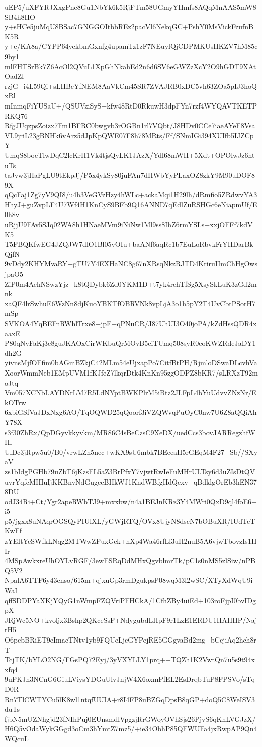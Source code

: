 uEP5/uXFYRJXxgPne8Gu1NbYk6k5RjFTm58UGmyYHmfs8AQqMnAAS5mW8SB4h8HO
y+sHCe5juMqU8BSac7GNGGOItbbREz2pacVl6NekqGC+PshY0MsVickFzufnBK5R
y+e/KA8a/CYPP64yekbmGxnfg4upamTz1zF7NEuylQjCDPMKUsHKZV7hM85c9by1
mlFHTSrBk7Z6AcOl2QVuL1XpGhNkahEd2n6d6SV6eGWZzXcY2O9hGDT9XAtOadZl
rzjG+i4L59Qi+sLHBcYfNEM8AaVkCm45SR7ZVAJRB0xDC5vh63ZOa5pIJ3hoQxRl
mInmqFiYUSaU+/QSUVziSyS+kfw48RtD0RkuwH3dpFYn7rzf4WYQAVTKETPRKQ76
RfgJUqzpsZoizx7Fm1BFRC0bwgvb3rOGBn1rl7VQbt/J8HDv0CCe7iaeAYeF8Vsa
VL9jriL23gBNHk6vArz5dJpKpQWE07F8h78MRts/Ff/SNmIGi394XUIfb5IJZCpY
UmqS8boeTlwDqC2lcKrH1Vk4tjsQyLK1JAzX/Ydl68mWH+5Xdt+OPOlwJz6htuTs
taJvw3jHaPgLU9tEkpJj/P5x4ykSy80juFAn7dHWbYyPLaxOZ8zkY9M90uDOF89X
qQcFaj1Zg7yV9QI8/u4h3VeGVzHzy4hWLc+ackaMqi1H29lh/dRmfio5ZRdwvYA3
HhyJ+guZvpLF4U7Wf4H1KnCyS9BFb9Q16ANND7qEdlZuRSHGc6eNiapmUf/E0h8v
uRjjU9FAv5SJq02WA8h1HNaeMVm9iNiNw1Ml9ss8IhZ6rmYSLs+xxjOFFf7kdVK5
T5FBQKfwEG4JZQJW7dlO1Bl05vOIu+baANf6aqRc1b7EuLoRbvkFrYHDarBkQjfN
9vDdy2KHYMvaRY+gTU7Y4EXHaNC8g67nXRsqNkzRJTD4KriruIImChHgOwsjpaO5
ZiP0m4AehNSwzYjz+k8tQDybk6Zd0YKM1D+t7yk4rchTfSg5XsySkLuK3zGd2mnk
xaQF4lrSwhuE6WzNn8djKuoYBKTfOBRVNk8vpLjA3o1h5pY2T4UvCbtPSorH7mSp
SVKOA4YqBEFnRWhlTrxe8+jpF+qPNuCR/J87UhUI3O40joPA/kZdHssQDR4xaaxE
P80qNvFaKj3e8guJKAOxCirWKbuQrMOvB5ciTUmq508syR0eoKWZRdeJaDY1dh2G
yivnsMjfOFfim0bAGmBZkjC42MLm54eUjxapPo7CitfBtPH/RjmloDSwaDLcvhVa
XoorWmmNeb1EMpUVM1fKJfeZ7lkqrDtk4KnKn95zgODPZ8bKR7/sLRXzT92moJtq
Vm057XCNbLAYDNrLM7R5LdNYptBWKPlrM5iBtz2JLFpL4bYuUdvvZNzNr/EkOTrw
6xbiGSfVaJDxNxg6AO/TqOQWD25qQoorf3iVZQWvqPuOyC0nw7U6Z8aQQiAhY78X
s3f30ZhRx/QpDGyvkkyvkm/MR86C4sBeCzsC9XeDX/uedCcs3bovJARRegzhfWHl
UlDc3jRpw5u0/B0/vrwLZn5nec+wKX9sU6mbk7BEeeaH5rGEqM4F27+Sb//SXyaV
zs1bIdgPGHb79uZbT6jKzsFL5aZ3BrPfxY7vjwtRwIeFuMHrULTsy6d3uZIsDtQV
uvrYqfcMHIuIjKKBnvNdGugccBHkWJ1KndWBfgHdQexv+qBdklgOrEb3hEN378DU
odJ34Ri+Ct/Ygr2apeRWbTJ9+mxxbw/n4a1BEJnKRz3Y4MWri0QxD9ql4foE6+i5
p5/jgxx8uNAqrOGSQyPIUlXL/yGWjRTQ/OVx8UjyN8dscN7bOBuXR/IUdTcTKwFf
zYEItYcSWfkLNqg2MTWwZPuxGck+nXp4Wa46rfLl3uH2nuB5A6vjwTbovzIs1HIr
4MSpAwkxreUhOYLvRGF/3ewESRqDdMHxQgvblmrTk/pC1s0nMS5zlSiw/nPBQ5V2
NpalA6TTF6y43enso/615m+qjxuGp3rmDgukpsP08wqM3l2wSC/XTyXdWqU9iWaI
qffSDDPYaXKjYQyG1nWmpFZQVriPFHCkA/1CfhZBy4uiEd+103roFjpI0bvIDgpX
JRjWc5NO+kvoljx3Bshp2QKceSsF+NdygubdLHpF9r1LzE1ERDU1HAHHP/NajrH5
O6pcbBRiET9eImacTNtv1yb9FQUeLjcGYPejRE5GGgvaBd2mg+bCcjiAq2hch8rT
TcjTK/bYLO2NG/FGsPQ72Eyj/3yVXYLLY1prq++TQZh1K2VwtQn7u5s9t94xxfq4
9uPKJn3NCnG6GiuLViysYDGuUlvJnjW4X6oxmPfEL2EsDrqbTuP8FPSVo/sTqD0R
Rn7TlCWTYCu5lK8wl1ntqfUUIA+r8I4FP8uBZGqDpsB8qGP+doQ5C8WeISV3duTs
fjbN5mUZNhgjd23fNIhPuj0EUnsmdlVpgzjRrGWoyOVhSjs26PjvS6qKnLVGJzX/
H6Q5vOdaWykGGgd3oCm3hYmtZ7mz5/+ie34ObhP85QFWUFa4jxRwpAP9Qn4WQcuL
